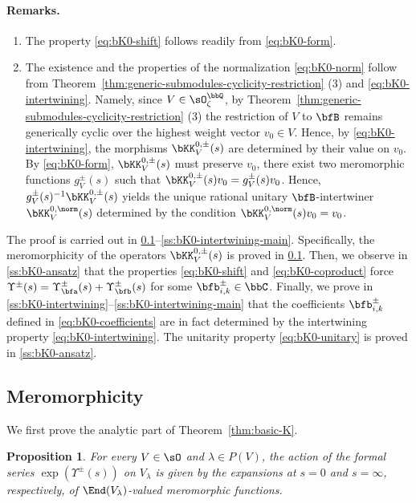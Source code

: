 \documentclass[reqno]{amsart}
\numberwithin{equation}{section}
\newtheorem*{proposition}{Proposition}
\newenvironment{remarks}{\medskip\paragraph{{\bf Remarks.} }}{\par\medskip}
\begin{document}
\begin{remarks}
\hfill
\begin{enumerate}[leftmargin=2em]\itemsep0.25cm
	\item 
	The property \eqref{eq:bK0-shift} follows readily from \eqref{eq:bK0-form}.
	\item 
	The existence and the properties of the normalization \eqref{eq:bK0-norm} follow 
	from Theorem~\ref{thm:generic-submodules-cyclicity-restriction} (3) and \eqref{eq:bK0-intertwining}. Namely, since $V\in\sO_\zeta^\bbQ$, by Theorem~\ref{thm:generic-submodules-cyclicity-restriction} (3) the
	restriction of $V$ to $\bfB$ remains generically cyclic over the highest weight vector $v_0\in V$. Hence, by \eqref{eq:bK0-intertwining}, 
	the morphisms $\bKK^{0,\pm}_V(s)$ are determined by their value on $v_0$.
	By \eqref{eq:bK0-form}, $\bKK^{0,\pm}_V(s)$ must preserve $v_0$, \ie there exist
	two meromorphic functions $g_V^{\pm}(s)$ such that $\bKK^{0,\pm}_V(s)v_0=g_V^{\pm}(s)v_0$. Hence, $g_V^{\pm}(s)^{-1}\bKK^{0,\pm}_V(s)$ yields the unique rational unitary $\bfB$-intertwiner $\bKK^{0,\norm}_{V}(s)$ determined by the condition $\bKK^{0,\norm}_{V}(s)v_0=v_0$.
	\hfill\rmkend
\end{enumerate}
\end{remarks}

The proof is carried out in \ref{ss:bK0-meromorphic}--\ref{ss:bK0-intertwining-main}.
Specifically, the meromorphicity of the operators $\bKK^{0,\pm}_V(s)$ is proved in 
\ref{ss:bK0-meromorphic}. Then, we observe in \ref{ss:bK0-ansatz} that the properties \eqref{eq:bK0-shift} and \eqref{eq:bK0-coproduct} force $\Upsilon^\pm(s)=\Upsilon_{\bfa}^\pm(s)+\Upsilon_{\bfb}^\pm(s)$ for some $\bfb^\pm_{i,k}\in\bbC$. Finally, we prove in \ref{ss:bK0-intertwining}--\ref{ss:bK0-intertwining-main} that the coefficients $\bfb^\pm_{i,k}$
defined in \eqref{eq:bK0-coefficients} are in fact determined by the intertwining property \eqref{eq:bK0-intertwining}. The unitarity property \eqref{eq:bK0-unitary} is proved in \ref{ss:bK0-ansatz}.

\subsection{Meromorphicity}\label{ss:bK0-meromorphic}

We first prove the analytic part of Theorem~\ref{thm:basic-K}.

\begin{proposition}\label{prop:bK0-meromorphic}
For every $V\in\sO$ and $\lambda\in P(V)$, the action of the formal series $\exp(\Upsilon^\pm(s))$ on $V_\lambda$ is given by the 
expansions at $s=0$ and $s=\infty$, respectively, of
$\End(V_\lambda)$-valued meromorphic functions.
\end{proposition}
\end{document}
